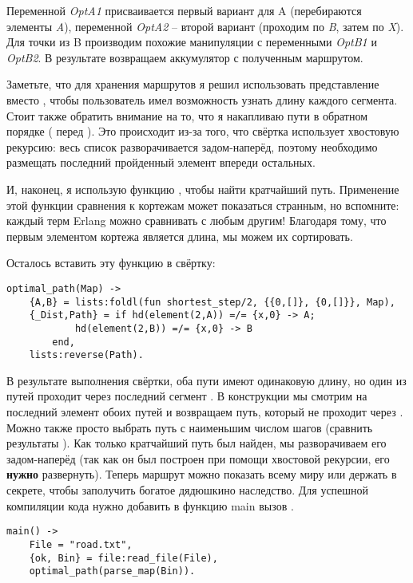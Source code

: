 Переменной \emph{OptA1} присваивается первый вариант для A (перебираются элементы \emph{A}), переменной \emph{OptA2} \--- второй вариант (проходим по \emph{B}, затем по \emph{X}).
Для точки из B производим похожие манипуляции с переменными \emph{OptB1} и \emph{OptB2}.
В результате возвращаем аккумулятор с полученным маршрутом.

Заметьте, что для хранения маршрутов я решил использовать представление \ops{[\{x,X\}]} вместо \ops{[x]}, чтобы пользователь имел возможность узнать длину каждого сегмента.
Стоит также обратить внимание на то, что я накапливаю пути в обратном порядке ( перед ).
Это происходит из\--за того, что свёртка использует хвостовую рекурсию: весь список разворачивается задом\--наперёд, поэтому необходимо размещать последний пройденный элемент впереди остальных.

И, наконец, я использую функцию , чтобы найти кратчайший путь.
Применение этой функции сравнения к кортежам может показаться странным, но вспомните: каждый терм Erlang можно сравнивать с любым другим!
Благодаря тому, что первым элементом кортежа является длина, мы можем их сортировать.

Осталось вставить эту функцию в свёртку:
\begin{lstlisting}[style=erlang]
optimal_path(Map) ->
    {A,B} = lists:foldl(fun shortest_step/2, {{0,[]}, {0,[]}}, Map),
    {_Dist,Path} = if hd(element(2,A)) =/= {x,0} -> A;
            hd(element(2,B)) =/= {x,0} -> B
        end,
    lists:reverse(Path).
\end{lstlisting}

В результате выполнения свёртки, оба пути имеют одинаковую длину, но один из путей проходит через последний сегмент .
В конструкции  мы смотрим на последний элемент обоих путей и возвращаем путь, который не проходит через .
Можно также просто выбрать путь с наименьшим числом шагов (сравнить результаты ).
Как только кратчайший путь был найден, мы разворачиваем его задом\--наперёд (так как он был построен при помощи хвостовой рекурсии, его \textbf{нужно} развернуть).
Теперь маршрут можно показать всему миру или держать в секрете, чтобы заполучить богатое дядюшкино наследство.
Для успешной компиляции кода нужно добавить в функцию main вызов .
\begin{lstlisting}[style=erlang]
main() ->
    File = "road.txt",
    {ok, Bin} = file:read_file(File),
    optimal_path(parse_map(Bin)).
\end{lstlisting}

